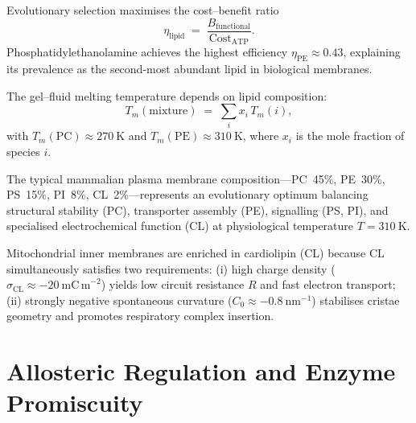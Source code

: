 \begin{theorem}
\label{thm:ch03-lipid-optimisation}
Evolutionary selection maximises the cost--benefit ratio
\begin{equation}
    \eta_\mathrm{lipid} \;=\; \frac{B_\mathrm{functional}}{\mathrm{Cost}_\mathrm{ATP}}.
    \label{eq:ch03-eta-lipid}
\end{equation}
Phosphatidylethanolamine achieves the highest efficiency
$\eta_\mathrm{PE}\approx 0.43$, explaining its prevalence as the second-most
abundant lipid in biological membranes.
\end{theorem}

\begin{theorem}
\label{thm:ch03-phase-transition}
The gel--fluid melting temperature depends on lipid composition:
\begin{equation}
    T_m(\mathrm{mixture}) \;=\; \sum_i x_i\,T_m(i),
    \label{eq:ch03-tm}
\end{equation}
with $T_m(\mathrm{PC})\approx 270~\mathrm{K}$ and
$T_m(\mathrm{PE})\approx 310~\mathrm{K}$, where $x_i$ is the mole fraction of
species $i$.
\end{theorem}

\begin{corollary}
\label{cor:ch03-physiological-mix}
The typical mammalian plasma membrane composition---PC~45\%, PE~30\%, PS~15\%,
PI~8\%, CL~2\%---represents an evolutionary optimum balancing structural
stability (PC), transporter assembly (PE), signalling (PS, PI), and specialised
electrochemical function (CL) at physiological temperature $T=310~\mathrm{K}$.
\end{corollary}

\begin{corollary}
\label{cor:ch03-cl-enrichment}
Mitochondrial inner membranes are enriched in cardiolipin (CL) because CL
simultaneously satisfies two requirements: (i) high charge density
($\sigma_\mathrm{CL}\approx -20~\mathrm{mC\,m}^{-2}$) yields low circuit
resistance $R$ and fast electron transport; (ii) strongly negative spontaneous
curvature ($C_0\approx -0.8~\mathrm{nm}^{-1}$) stabilises cristae geometry and
promotes respiratory complex insertion.
\end{corollary}

\section{Allosteric Regulation and Enzyme Promiscuity}
\label{sec:ch03-allosteric}

